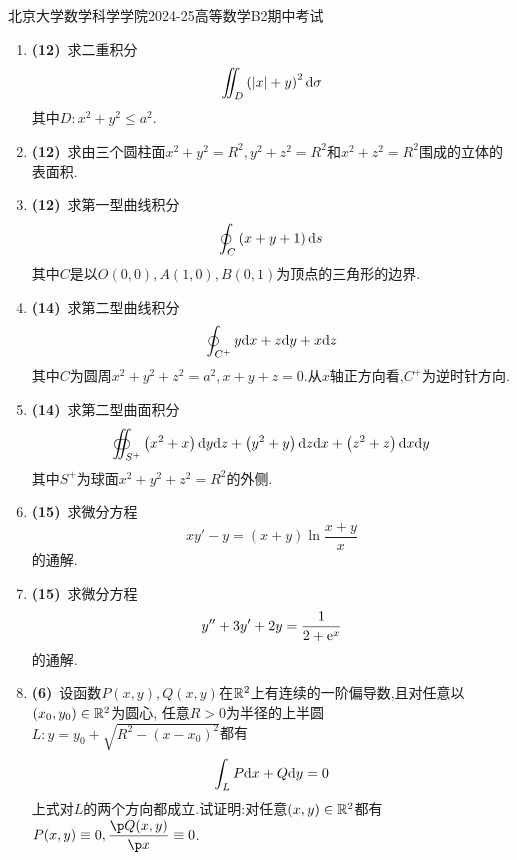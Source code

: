 \documentclass{ctexart}
\begin{document}
\pagestyle{empty}
\begin{center}\Large
    北京大学数学科学学院2024-25高等数学B2期中考试
\end{center}
\begin{enumerate}[leftmargin=*,label=\textbf{\arabic*.}]
    \item \textbf{(12)}\ 求二重积分
        \[\iint_{D}\left(|x|+y\right)^2\mathrm{d}\sigma\]
        其中$D:x^2+y^2\leqslant a^2$.

    \item \textbf{(12)}\ 求由三个圆柱面$x^2+y^2=R^2,y^2+z^2=R^2$和$x^2+z^2=R^2$围成的立体的表面积.

    \item \textbf{(12)}\ 求第一型曲线积分
        \[\oint_C\left(x+y+1\right)\mathrm{d} s\]
        其中$C$是以$O(0,0),A(1,0),B(0,1)$为顶点的三角形的边界.

    \item \textbf{(14)}\ 求第二型曲线积分
        \[\oint_{C^+}y\mathrm{d} x+z\mathrm{d} y+x\mathrm{d} z\]
        其中$C$为圆周$x^2+y^2+z^2=a^2,x+y+z=0$.从$x$轴正方向看,$C^+$为逆时针方向.
        
    \item \textbf{(14)}\ 求第二型曲面积分
        \[\oiint_{S^+}\left(x^2+x\right)\mathrm{d} y\mathrm{d} z+\left(y^2+y\right)\mathrm{d} z\mathrm{d} x+\left(z^2+z\right)\mathrm{d} x\mathrm{d} y\]
        其中$S^+$为球面$x^2+y^2+z^2=R^2$的外侧.

    \item \textbf{(15)}\ 求微分方程
        \[xy'-y=\left(x+y\right)\ln\dfrac{x+y}{x}\]
        的通解.

    \item \textbf{(15)}\ 求微分方程
        \[y''+3y'+2y=\dfrac{1}{2+\mathrm{e}^x}\]
        的通解.

    \item \textbf{(6)}\ 设函数$P(x,y),Q(x,y)$在$\mathbb{R}^2$上有连续的一阶偏导数,且对任意以$\left(x_0,y_0\right)\in\mathbb{R}^2$为圆心,%
        任意$R>0$为半径的上半圆$L:y=y_0+\sqrt{R^2-\left(x-x_0\right)^2}$都有
        \[\int_LP\mathrm{d} x+Q\mathrm{d} y=0\]
        上式对$L$的两个方向都成立.试证明:对任意$(x,y)\in\mathbb{R}^2$都有$P(x,y)\equiv0,\dfrac{\p Q(x,y)}{\p x}\equiv0$.
    
\end{enumerate}
\end{document}
